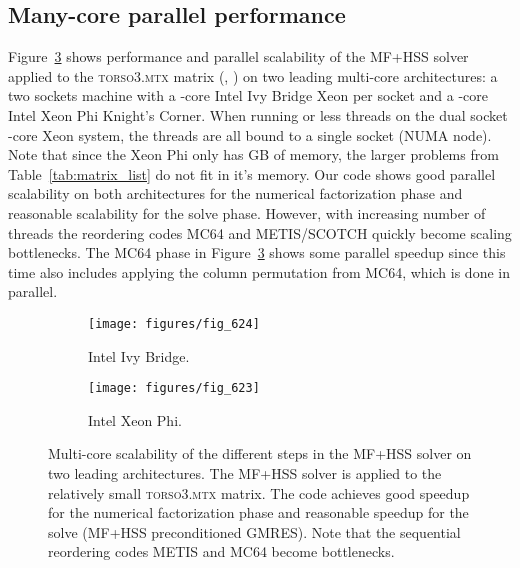 \documentclass{article}
\newcommand{\tm}{\textsuperscript{\textregistered}}
\begin{document}
\subsection{Many-core parallel performance}
Figure~\ref{fig:scaling_edison_babbage} shows performance and parallel
scalability of the MF+HSS solver applied to the \textsc{torso3.mtx}
matrix (, ) on two leading multi-core
architectures: a two sockets machine with a -core Intel\tm{} Ivy
Bridge Xeon per socket and a -core Intel\tm{} Xeon Phi Knight's
Corner. When running  or less threads on the dual socket -core
Xeon system, the threads are all bound to a single socket (NUMA
node). Note that since the Xeon Phi only has GB of memory, the
larger problems from Table~\ref{tab:matrix_list} do not fit in it's
memory. Our code shows good parallel scalability on both architectures
for the numerical factorization phase and reasonable scalability for
the solve phase. However, with increasing number of threads the
reordering codes MC64 and METIS/SCOTCH quickly become scaling
bottlenecks. The MC64 phase in Figure~\ref{fig:scaling_edison_babbage}
shows some parallel speedup since this time also includes applying the
column permutation from MC64, which is done in parallel.
\begin{figure}
  \begin{center}
    \begin{subfigure}{.49\textwidth}
      \texttt{[image: figures/fig\_624]}
      \caption{\footnotesize Intel\tm{} Ivy Bridge.}
      \label{fig:622}
    \end{subfigure}
    \begin{subfigure}{.49\textwidth}
      \texttt{[image: figures/fig\_623]}
      \caption{\footnotesize Intel\tm{} Xeon Phi.}
      \label{fig:623}
    \end{subfigure}
  \end{center}
  \caption{\footnotesize Multi-core scalability of the different steps in the MF+HSS
    solver on two leading architectures. The MF+HSS solver is applied
    to the relatively small \textsc{torso3.mtx} matrix. The code
    achieves good speedup for the numerical factorization phase and
    reasonable speedup for the solve (MF+HSS preconditioned
    GMRES). Note that the sequential reordering codes METIS and MC64
    become bottlenecks.}
  \label{fig:scaling_edison_babbage}
\end{figure}
\end{document}
